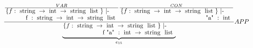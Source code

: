 \begin{equation}
\frac
{
	\frac{
		VAR
	}
	{
    		\splitfrac
    		{ 
    			\{ f: \tauonestring \} \text{ |- }
    		} 
    		{ 
    			\text{ f }: \tauonestring
    		}
	}
	\frac{
		CON
	}
	{
    		\splitfrac
    		{ 
    			\{ f: \tauonestring \} \text{ |- }
    		} 
    		{ 
    			\text{ "a" }: \tauthree
    		}
	}
}
{
	\underbrace{
    		\splitfrac
    		{ 
    			\{ f: \tauonestring \} \text{ |- }
    		} 
    		{ 
    			\text{ f "a" }: \tauthree \rightarrow \taufourstring
    		}
	}_{e_{15}}
}  
{
	APP
}
\end{equation}



